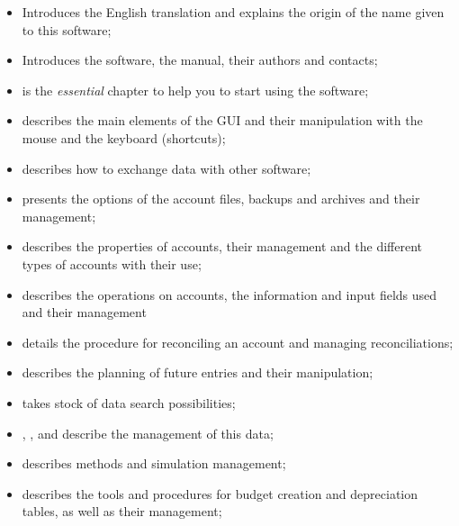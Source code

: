 \begin{itemize}

\item {} Introduces the English translation and explains the origin of the name given to this software;

\item {} Introduces the software, the manual, their authors and contacts;

\item {} is the \emph{essential} chapter to help you to start using the software;

\item {} describes the main elements of the GUI and their manipulation with the mouse and the keyboard (shortcuts);

\item {} describes how to exchange data with other software;

\item {} presents the options of the account files, backups and archives and their management;

\item {} describes the properties of accounts, their management and the different types of accounts with their use;

\item {} describes the operations on accounts, the information and input fields used and their management

\item {} details the procedure for reconciling an account and managing reconciliations;

\item {} describes the planning of future entries and their manipulation;

\item {} takes stock of data search possibilities;

\item {}, ,  and  describe the management of this data;

\item {} describes methods and simulation management;

\item {} describes the tools and procedures for budget creation and depreciation tables, as well as their management;


\end{itemize}
